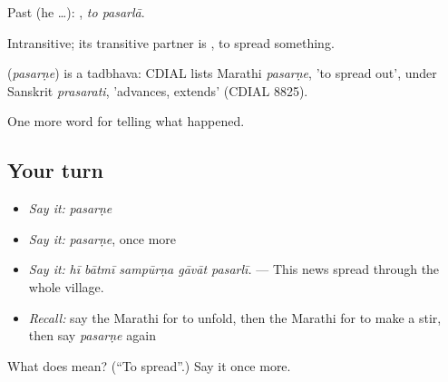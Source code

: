 Past (he …):  , \emph{to pasarlā}.

Intransitive; its transitive partner is , to spread something.

\begin{cousinweb}
\textbf{} (\emph{pasarṇe}) is a tadbhava: CDIAL lists Marathi \emph{pasarṇe}, 'to spread out', under Sanskrit \emph{prasarati}, 'advances, extends' (CDIAL 8825).
\end{cousinweb}

\begin{grammarlens}[title={What you've built}]
One more word for telling what happened.
\end{grammarlens}

\subsection*{Your turn}
\begin{itemize}
\raggedright
  \item \emph{Say it:} \emph{pasarṇe}
  \item \emph{Say it:} \emph{pasarṇe}, once more
  \item \emph{Say it:} \emph{hī bātmī sampūrṇa gāvāt pasarlī.} — This news spread through the whole village.
  \item \emph{Recall:} say the Marathi for to unfold, then the Marathi for to make a stir, then say \emph{pasarṇe} again
\end{itemize}

\begin{tcolorbox}[breakable,colback=teal!4,colframe=teal!35!black,title={Before you move on}]
What does  mean? (\textquotedblleft{}To spread\textquotedblright{}.) Say it once more.
\end{tcolorbox}
